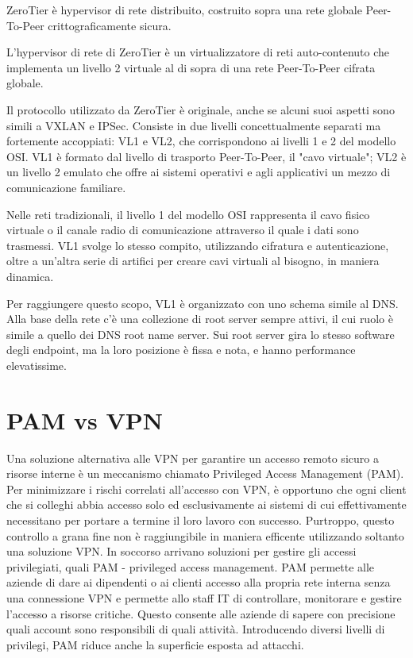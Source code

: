 ZeroTier è hypervisor di rete distribuito, costruito sopra una rete globale Peer-To-Peer crittograficamente sicura.

L'hypervisor di rete di ZeroTier è un virtualizzatore di reti auto-contenuto che implementa un livello 2 virtuale al di sopra di una rete Peer-To-Peer cifrata globale.

Il protocollo utilizzato da ZeroTier è originale, anche se alcuni suoi aspetti sono simili a VXLAN e IPSec. Consiste in due livelli concettualmente separati ma fortemente accoppiati: VL1 e VL2, che corrispondono ai livelli 1 e 2 del modello OSI. VL1 è formato dal livello di trasporto Peer-To-Peer, il "cavo virtuale"; VL2 è un livello 2 emulato che offre ai sistemi operativi e agli applicativi un mezzo di comunicazione familiare.

Nelle reti tradizionali, il livello 1 del modello OSI rappresenta il cavo fisico virtuale o il canale radio di comunicazione attraverso il quale i dati sono trasmessi. VL1 svolge lo stesso compito, utilizzando cifratura e autenticazione, oltre a un'altra serie di artifici per creare cavi virtuali al bisogno, in maniera dinamica.

Per raggiungere questo scopo, VL1 è organizzato con uno schema simile al DNS. Alla base della rete c'è una collezione di root server sempre attivi, il cui ruolo è simile a quello dei DNS root name server. Sui root server gira lo stesso software degli endpoint, ma la loro posizione è fissa e nota, e hanno performance elevatissime.


\section{PAM vs VPN}
Una soluzione alternativa alle VPN per garantire un accesso remoto sicuro a risorse interne è un meccanismo chiamato Privileged Access Management (PAM).
Per minimizzare i rischi correlati all'accesso con VPN, è opportuno che ogni client che si colleghi abbia accesso solo ed esclusivamente ai sistemi di cui effettivamente necessitano per portare a termine il loro lavoro con successo.
Purtroppo, questo controllo a grana fine non è raggiungibile in maniera efficente utilizzando soltanto una soluzione VPN. In soccorso arrivano soluzioni per gestire gli accessi privilegiati, quali PAM - privileged access management.
PAM permette alle aziende di dare ai dipendenti o ai clienti accesso alla propria rete interna senza una connessione VPN e permette allo staff IT di controllare, monitorare e gestire l'accesso a risorse critiche. Questo consente alle aziende di sapere con precisione quali account sono responsibili di quali attività.
Introducendo diversi livelli di privilegi, PAM riduce anche la superficie esposta ad attacchi.

